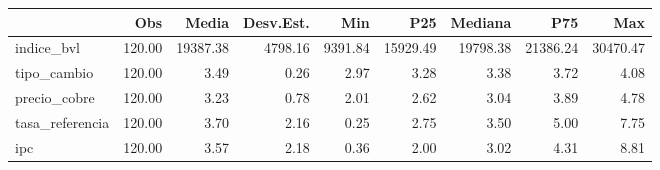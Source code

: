 \begin{tabular}{lrrrrrrrr}
\toprule
 & Obs & Media & Desv.Est. & Min & P25 & Mediana & P75 & Max \\
\midrule
indice_bvl & 120.00 & 19387.38 & 4798.16 & 9391.84 & 15929.49 & 19798.38 & 21386.24 & 30470.47 \\
tipo_cambio & 120.00 & 3.49 & 0.26 & 2.97 & 3.28 & 3.38 & 3.72 & 4.08 \\
precio_cobre & 120.00 & 3.23 & 0.78 & 2.01 & 2.62 & 3.04 & 3.89 & 4.78 \\
tasa_referencia & 120.00 & 3.70 & 2.16 & 0.25 & 2.75 & 3.50 & 5.00 & 7.75 \\
ipc & 120.00 & 3.57 & 2.18 & 0.36 & 2.00 & 3.02 & 4.31 & 8.81 \\
\bottomrule
\end{tabular}
